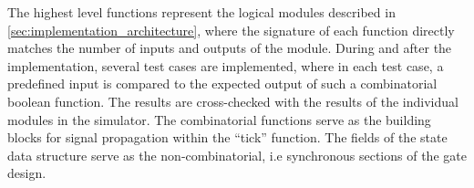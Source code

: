 The highest level functions represent the logical modules described in \autoref{sec:implementation_architecture}, where the signature of each function directly matches the number of inputs and outputs of the module. During and after the implementation, several test cases are implemented, where in each test case, a predefined input is compared to the expected output of such a combinatorial boolean function. The results are cross-checked with the results of the individual modules in the simulator. The combinatorial functions serve as the building blocks for signal propagation within the ``tick'' function. The fields of the state data structure serve as the non-combinatorial, i.e synchronous sections of the gate design.


